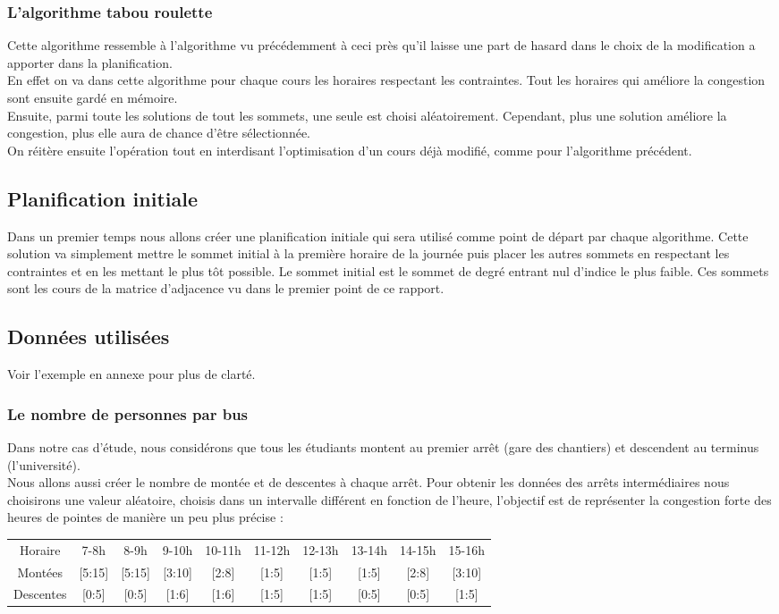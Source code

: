 \documentclass[a4paper,11pt]{article}
\begin{document}
		\subsubsection{L'algorithme tabou roulette}
		Cette algorithme ressemble à l'algorithme vu précédemment à ceci près qu'il laisse une part de hasard dans le choix de la modification a apporter dans la planification.\\
		En effet on va dans cette algorithme pour chaque cours les horaires respectant les contraintes. Tout les horaires qui améliore la congestion sont ensuite gardé en mémoire.\\
		Ensuite, parmi toute les solutions de tout les sommets, une seule est choisi aléatoirement. Cependant, plus une solution améliore la congestion, plus elle aura de chance d'être sélectionnée.\\
		On réitère ensuite l'opération tout en interdisant l'optimisation d'un cours déjà modifié, comme pour l'algorithme précédent. 
	\subsection{Planification initiale}
		Dans un premier temps nous allons créer une planification initiale qui sera utilisé comme point de départ par chaque algorithme.
		Cette solution va simplement mettre le sommet initial à la première horaire de la journée puis placer les autres sommets en respectant les contraintes et en les mettant le plus tôt possible.
		Le sommet initial est le sommet de degré entrant nul d'indice le plus faible.
		Ces sommets sont les cours de la matrice d'adjacence vu dans le premier point de ce rapport.
	\subsection{Données utilisées}
		Voir l'exemple en annexe pour plus de clarté.
		\subsubsection{Le nombre de personnes par bus}
		Dans notre cas d'étude, nous considérons que tous les étudiants montent au premier arrêt (gare des chantiers) et descendent au terminus (l'université).\\
		Nous allons aussi créer le nombre de montée et de descentes à chaque arrêt.
 		Pour obtenir les données des arrêts intermédiaires nous choisirons une valeur aléatoire, choisis dans un intervalle différent en fonction de l'heure, l'objectif est de représenter la congestion forte des heures de pointes de manière un peu plus précise : \\
 		\begin{tabular}{ | c | c | c | c | c | c | c | c | c | c |}
 			\hline			
   			Horaire & 7-8h & 8-9h & 9-10h & 10-11h & 11-12h & 12-13h & 13-14h & 14-15h & 15-16h\\
   			Montées & [5:15] & [5:15] & [3:10] & [2:8] & [1:5] & [1:5] & [1:5] & [2:8] & [3:10]\\
   			Descentes & [0:5] & [0:5] & [1:6] & [1:6] & [1:5] & [1:5] & [0:5] & [0:5] & [1:5]\\
 			\hline  
 		\end{tabular}\\
\end{document}
